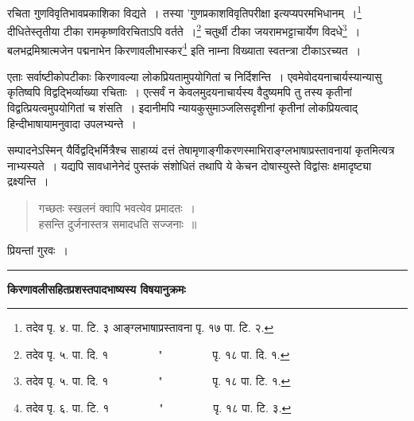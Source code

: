 \documentclass[11pt, openany]{book}
\begin{document}
\newpage
\noindent
रचिता {\knu गुणविवृतिभावप्रकाशिका} विद्यते~। तस्या {\knu 'गुणप्रकाशविवृतिपरीक्षा} इत्यप्यपरमभिधानम्~।\renewcommand{\thefootnote}{४९}\footnote{तदेव पृ. ४. पा. टि. ३ आङ्ग्लभाषाप्रस्तावना पृ. १७ पा. टि. २.} दीधितेस्तृतीया टीका {\knu रामकृष्ण}विरचिताऽपि वर्तते~।\renewcommand{\thefootnote}{५०}\footnote{तदेव पृ. ५. पा. दि. १~~~~~~~~~"~~~~~~~~~पृ. १८ पा. दि. १.} चतुर्थी टीका {\knu जयरामभट्टाचार्येण} विदधे\renewcommand{\thefootnote}{५१}\footnote{तदेव पृ. ५. पा. दि. १~~~~~~~~~"~~~~~~~~~पृ. १८ पा. टि. १.}~। {\knu बलभद्रमिश्रात्मजेन पद्मनाभेन किरणावलीभास्कर}\renewcommand{\thefootnote}{५२}\footnote{तदेव पृ. ६. पा. टि. १~~~~~~~~~"~~~~~~~~~पृ. १८ पा. टि. ३.} इति नाम्ना विख्याता स्वतन्त्रा टीकाऽरच्यत~।

एताः सर्वाष्टीकोपटीकाः किरणावल्या लोकप्रियतामुपयोगितां च निर्दिशन्ति~। एवमेवोदयनाचार्यस्यान्यासु कृतिष्वपि विद्वद्भिर्व्याख्या रचिताः~। एत्सर्वं न केवलमुदयनाचार्यस्य वैदुष्यमपि तु तस्य कृतीनां विद्वत्प्रियत्वमुपयोगितां च शंसति~। इदानीमपि न्यायकुसुमाञ्जलिसदृशीनां कृतीनां लोकप्रियत्वाद् हिन्दीभाषायामनुवादा उपलभ्यन्ते~।

सम्पादनेऽस्मिन् यैर्विद्वद्भिर्मित्रैश्च साहाय्यं दत्तं तेषामृणाङ्गीकरणस्माभिराङ्ग्लभाषाप्रस्तावनायां कृतमित्यत्र नाभ्यस्यते~। यद्यपि सावधानेनेदं पुस्तकं संशोधितं तथापि ये केचन दोषास्युस्ते विद्वांसः क्षमादृष्ट्या द्रक्ष्यन्ति~।

\begin{quote}
{\qt गच्छतः स्खलनं क्वापि भवत्येव प्रमादतः~।\\
हसन्ति दुर्जनास्तत्र समादधति सज्जनाः~॥}
\end{quote}

प्रियन्तां गुरवः~।

\begin{center}
\rule{0.2\linewidth}{0.5pt}
\end{center}

\newpage
\thispagestyle{empty}
\begin{center}
\textbf{\Large किरणावलीसहितप्रशस्तपादभाष्यस्य विषयानुक्रमः}
\end{center}
\end{document}

